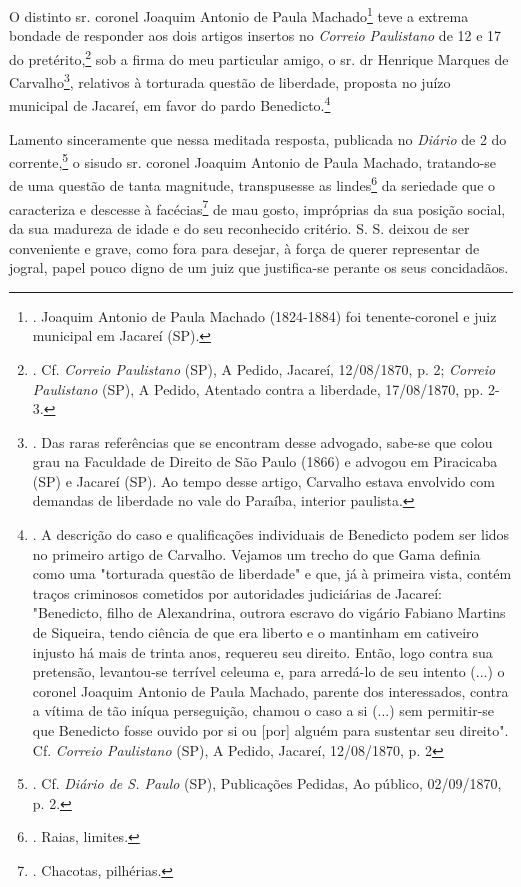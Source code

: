 O distinto sr. coronel Joaquim Antonio de Paula Machado\footnote{.
  Joaquim Antonio de Paula Machado (1824-1884) foi tenente-coronel e
  juiz municipal em Jacareí (SP).} teve a extrema bondade de responder
aos dois artigos insertos no \emph{Correio Paulistano} de 12 e 17 do
pretérito,\footnote{. Cf. \emph{Correio Paulistano} (SP), A Pedido,
  Jacareí, 12/08/1870, p. 2; \emph{Correio Paulistano} (SP), A Pedido,
  Atentado contra a liberdade, 17/08/1870, pp. 2-3.} sob a firma do meu
particular amigo, o sr. dr Henrique Marques de Carvalho\footnote{. Das
  raras referências que se encontram desse advogado, sabe-se que colou
  grau na Faculdade de Direito de São Paulo (1866) e advogou em
  Piracicaba (SP) e Jacareí (SP). Ao tempo desse artigo, Carvalho estava
  envolvido com demandas de liberdade no vale do Paraíba, interior
  paulista.}, relativos à torturada questão de liberdade, proposta no
juízo municipal de Jacareí, em favor do pardo Benedicto.\footnote{. A
  descrição do caso e qualificações individuais de Benedicto podem ser
  lidos no primeiro artigo de Carvalho. Vejamos um trecho do que Gama
  definia como uma "torturada questão de liberdade" e que, já à primeira
  vista, contém traços criminosos cometidos por autoridades judiciárias
  de Jacareí: "Benedicto, filho de Alexandrina, outrora escravo do
  vigário Fabiano Martins de Siqueira, tendo ciência de que era liberto
  e o mantinham em cativeiro injusto há mais de trinta anos, requereu
  seu direito. Então, logo contra sua pretensão, levantou-se terrível
  celeuma e, para arredá-lo de seu intento (...) o coronel Joaquim
  Antonio de Paula Machado, parente dos interessados, contra a vítima de
  tão iníqua perseguição, chamou o caso a si (...) sem permitir-se que
  Benedicto fosse ouvido por si ou {[}por{]} alguém para sustentar seu
  direito". Cf. \emph{Correio Paulistano} (SP), A Pedido, Jacareí,
  12/08/1870, p. 2}

Lamento sinceramente que nessa meditada resposta, publicada no
\emph{Diário} de 2 do corrente,\footnote{. Cf. \emph{Diário de S. Paulo}
  (SP), Publicações Pedidas, Ao público, 02/09/1870, p. 2.} o sisudo sr.
coronel Joaquim Antonio de Paula Machado, tratando-se de uma questão de
tanta magnitude, transpusesse as lindes\footnote{. Raias, limites.} da
seriedade que o caracteriza e descesse à facécias\footnote{. Chacotas,
  pilhérias.} de mau gosto, impróprias da sua posição social, da sua
madureza de idade e do seu reconhecido critério. S. S. deixou de ser
conveniente e grave, como fora para desejar, à força de querer
representar de jogral, papel pouco digno de um juiz que justifica-se
perante os seus concidadãos.

